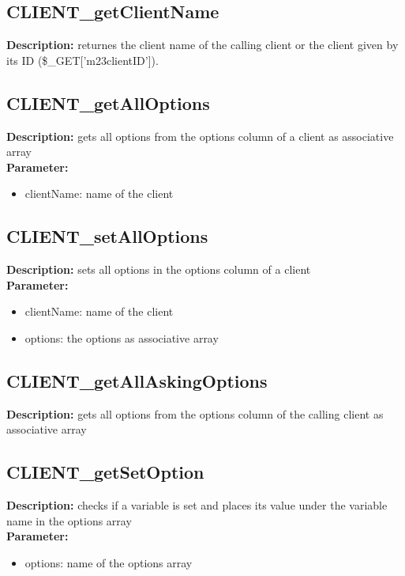 \subsection{CLIENT\_getClientName}
\textbf{Description:} returnes the client name of the calling client or the client given by its ID (\$\_GET['m23clientID']).\\

\subsection{CLIENT\_getAllOptions}
\textbf{Description:} gets all options from the options column of a client as associative array\\
\textbf{Parameter:}
\begin{itemize}
\item clientName: name of the client
\end{itemize}

\subsection{CLIENT\_setAllOptions}
\textbf{Description:} sets all options in the options column of a client\\
\textbf{Parameter:}
\begin{itemize}
\item clientName: name of the client
\item options: the options as associative array
\end{itemize}

\subsection{CLIENT\_getAllAskingOptions}
\textbf{Description:} gets all options from the options column of the calling client as associative array\\

\subsection{CLIENT\_getSetOption}
\textbf{Description:} checks if a variable is set and places its value under the variable name in the options array\\
\textbf{Parameter:}
\begin{itemize}
\item options: name of the options array
\end{itemize}

